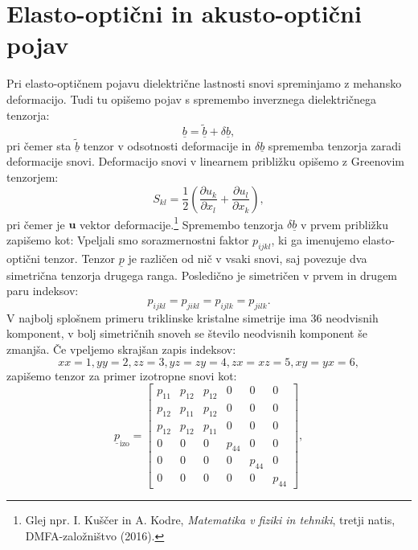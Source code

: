 \section{Elasto-optični in akusto-optični pojav}
Pri elasto-optičnem pojavu dielektrične lastnosti snovi
spreminjamo z mehansko deformacijo. Tudi tu opišemo pojav
s spremembo inverznega dielektričnega tenzorja:
\begin{equation}
\underline{b} = \underline{\tilde{b}}+ \delta\underline{b},
\end{equation}
pri čemer sta $\underline{\tilde{b}}$ tenzor v odsotnosti deformacije in
$\delta\underline{b}$ sprememba tenzorja zaradi deformacije snovi. Deformacijo
snovi v linearnem približku opišemo z Greenovim tenzorjem:
\begin{equation}
S_{kl}=\frac{1}{2}\left({\frac{\partial u_{k}}{\partial x_{l}}}+
{\frac{\partial u_{l}}{\partial x_{k}}}\right)\!\!,
\label{7.28}
\end{equation}
pri čemer je $\mathbf{u}$ vektor deformacije.\footnote{Glej npr. I. Kuščer in A. Kodre,  
{\it Matematika v fiziki in tehniki}, tretji natis, DMFA-založništvo (2016).}
\newpage
Spremembo tenzorja
$\delta\underline{b}$ v prvem približku zapišemo kot:
Vpeljali smo sorazmernostni faktor
$p_{ijkl}$, ki ga imenujemo elasto-optični tenzor. 
Tenzor $\underline{p}$ je različen od nič v vsaki snovi, saj povezuje dva simetrična tenzorja 
drugega ranga. Posledično je simetričen v prvem in drugem paru indeksov:
\begin{equation}
p_{ijkl} = p_{jikl} = p_{ijlk} =p_{jilk}.
\end{equation}
V najbolj splošnem primeru triklinske kristalne simetrije 
ima 36 neodvisnih komponent, v bolj simetričnih snoveh se število 
neodvisnih komponent še zmanjša. Če vpeljemo skrajšan zapis indeksov:
\begin{equation}
xx = 1, yy=2, zz = 3, yz = zy = 4, zx = xz = 5, xy = yx = 6,
\end{equation}
zapišemo tenzor za primer izotropne snovi kot:
\begin{equation}
\underline{p}_{\textrm{izo}} = 
\left[\begin{array}{cccccc}
p_{11} & p_{12}& p_{12}&0&0&0\\
p_{12} & p_{11}& p_{12}&0&0&0\\
p_{12} & p_{12}& p_{11}&0&0&0\\
0 & 0& 0&p_{44}&0&0\\
0 & 0& 0&0&p_{44}&0\\
0 & 0& 0&0&0&p_{44}
\end{array}\right]\!\!,
\label{tenzorp}
\end{equation}
